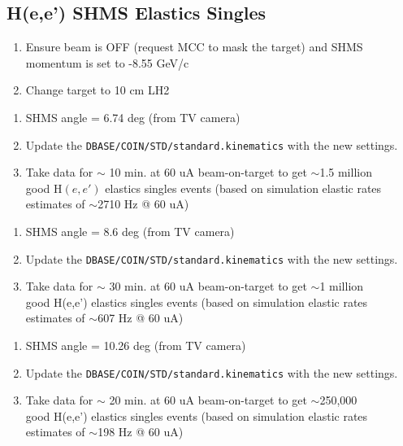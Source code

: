 \documentclass{article}
\begin{document}
\subsection*{H(e,e') SHMS Elastics Singles}
\begin{enumerate}
    \item Ensure beam is OFF (request MCC to mask the target) and SHMS momentum is set to -8.55 GeV/c
    \item Change target to 10 cm LH2 
    \end{enumerate}

    \begin{enumerate}
    \subsection*{H(e,e') Elastics Kin-Setting 2}
    \item SHMS angle = 6.74 deg (from TV camera)
    \item Update the \texttt{DBASE/COIN/STD/standard.kinematics} with the new settings.
    \item Take data for $\sim$ 10  min. at 60 uA beam-on-target to get $\sim$1.5 million \\
    good H$(e,e')$ elastics singles events (based on simulation elastic rates estimates of $\sim$2710 Hz @ 60 uA)
    \end{enumerate}
    
    \begin{enumerate}
    \subsection*{H(e,e') Elastics Kin-Setting 1}
    \item SHMS angle = 8.6 deg (from TV camera)
    \item Update the \texttt{DBASE/COIN/STD/standard.kinematics} with the new settings.
    \item Take data for $\sim$ 30  min. at 60 uA beam-on-target to get $\sim$1 million \\
     good H(e,e') elastics singles events (based on simulation elastic rates estimates of $\sim$607 Hz @ 60 uA)
    \end{enumerate}
    
    \begin{enumerate}
    \subsection*{H(e,e') Elastics Kin-Setting 0}
    \item SHMS angle = 10.26 deg (from TV camera)
    \item Update the \texttt{DBASE/COIN/STD/standard.kinematics} with the new settings.
    \item Take data for $\sim$ 20  min. at 60 uA beam-on-target to get $\sim$250,000 \\
     good H(e,e') elastics singles events (based on simulation elastic rates estimates of $\sim$198 Hz @ 60 uA)
    \end{enumerate}
\end{document}
